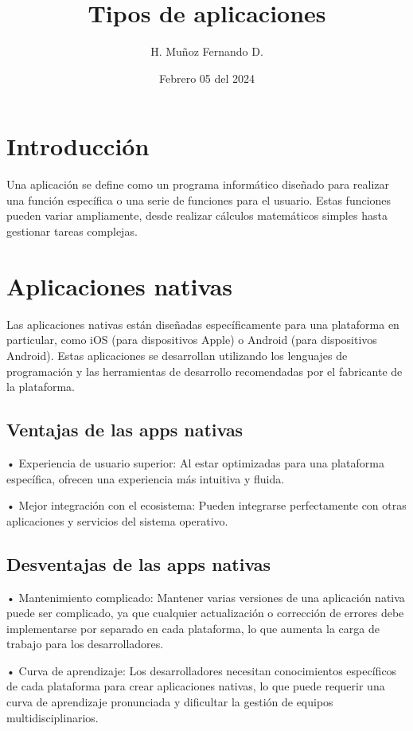 \documentclass{article}
\title{Tipos de aplicaciones}
\author{H. Muñoz Fernando D.}
\date{Febrero 05 del 2024}
\begin{document}
 
	
	\begin{multicols}{2}
		\section{Introducción}
		Una aplicación se define como un programa informático diseñado para realizar una función específica o una serie de funciones para el usuario. Estas funciones pueden variar ampliamente, desde realizar cálculos matemáticos simples hasta gestionar tareas complejas.
		
		
		\section{Aplicaciones nativas}
		
		Las aplicaciones nativas están diseñadas específicamente para una plataforma en particular, como iOS (para dispositivos Apple) o Android (para dispositivos Android). Estas aplicaciones se desarrollan utilizando los lenguajes de programación y las herramientas de desarrollo recomendadas por el fabricante de la plataforma.
		
		
		\subsection{Ventajas de las apps nativas}
				
		• Experiencia de usuario superior: Al estar optimizadas para una plataforma específica, ofrecen una experiencia más intuitiva y fluida.
		
		• Mejor integración con el ecosistema: Pueden integrarse perfectamente con otras aplicaciones y servicios del sistema operativo.
		
		
		\subsection{Desventajas de las apps nativas }
		
		• Mantenimiento complicado: Mantener varias versiones de una aplicación nativa puede ser complicado, ya que cualquier actualización o corrección de errores debe implementarse por separado en cada plataforma, lo que aumenta la carga de trabajo para los desarrolladores.
		
		• Curva de aprendizaje: Los desarrolladores necesitan conocimientos específicos de cada plataforma para crear aplicaciones nativas, lo que puede requerir una curva de aprendizaje pronunciada y dificultar la gestión de equipos multidisciplinarios.
		

\end{multicols}
\end{document}
